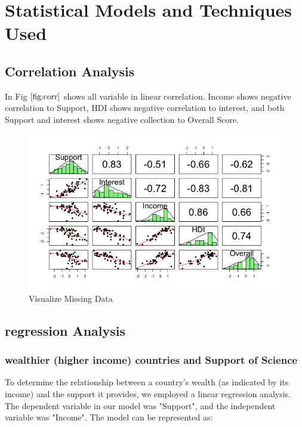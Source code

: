 \documentclass[12pt]{article}
\begin{document}
\section{Statistical Models and Techniques Used}

\subsection{Correlation Analysis}
\label{ss.corr}

In Fig $\ref{fig:corr}$ shows all variable in linear correlation.
Income shows negative correlation to Support,
HDI shows negative correlation to interest,
and both Support and interest shows negative collection to Overall Score.


\begin{figure}[htb]
  \centering
  \includegraphics[width=\linewidth]{images/corr}
  \caption{Visualize Missing Data}
  \label{fig:corr}
\end{figure}


\subsection{regression Analysis}
\label{ss.reg}

\subsubsection{wealthier (higher income) countries and Support of Science}
\label{sss.incvssup}

To determine the relationship between a country's wealth (as indicated by its income) and the support it provides, we employed a linear regression analysis. The dependent variable in our model was "Support", and the independent variable was "Income". The model can be represented as:
\end{document}
